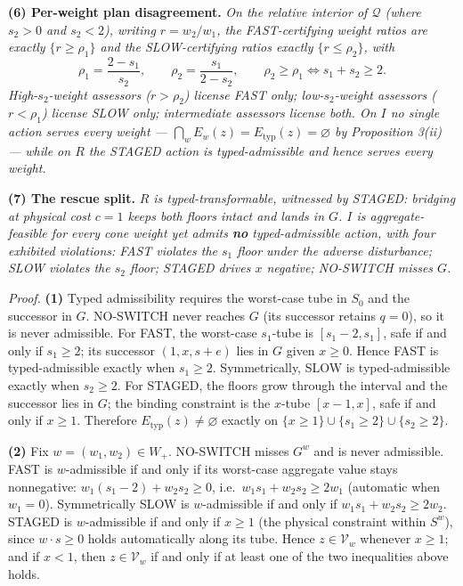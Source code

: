 \documentclass[11pt]{article}
\begin{document}
\textbf{(6) Per-weight plan disagreement.} \emph{On the relative
interior of \(\mathcal{Q}\) (where \(s_2 > 0\) and \(s_2 < 2\)), writing
\(r = w_2 / w_1\), the FAST-certifying weight ratios are exactly
\(\{ r \ge \rho_1 \}\) and the SLOW-certifying ratios exactly
\(\{ r \le \rho_2 \}\), with}
\[\rho_1 = \frac{2 - s_1}{s_2}, \qquad \rho_2 = \frac{s_1}{2 - s_2}, \qquad \rho_2 \ge \rho_1 \iff s_1 + s_2 \ge 2.\]
\emph{High-\(s_2\)-weight assessors (\(r > \rho_2\)) license FAST only;
low-\(s_2\)-weight assessors (\(r < \rho_1\)) license SLOW only;
intermediate assessors license both. On \(I\) no single action serves
every weight ---
\(\bigcap_w E_w(z) = E_{\mathrm{typ}}(z) = \varnothing\) by Proposition
3(ii) --- while on \(R\) the STAGED action is typed-admissible and hence
serves every weight.}

\textbf{(7) The rescue split.} \emph{\(R\) is typed-transformable,
witnessed by STAGED: bridging at physical cost \(c = 1\) keeps both
floors intact and lands in \(G\). \(I\) is aggregate-feasible for every
cone weight yet admits \textbf{no} typed-admissible action, with four
exhibited violations: FAST violates the \(s_1\) floor under the adverse
disturbance; SLOW violates the \(s_2\) floor; STAGED drives \(x\)
negative; NO-SWITCH misses \(G\).}

\emph{Proof.} \textbf{(1)} Typed admissibility requires the worst-case
tube in \(S_0\) and the successor in \(G\). NO-SWITCH never reaches
\(G\) (its successor retains \(q = 0\)), so it is never admissible. For
FAST, the worst-case \(s_1\)-tube is \([s_1 - 2, s_1]\), safe if and
only if \(s_1 \ge 2\); its successor \((1, x, s + e)\) lies in \(G\)
given \(x \ge 0\). Hence FAST is typed-admissible exactly when
\(s_1 \ge 2\). Symmetrically, SLOW is typed-admissible exactly when
\(s_2 \ge 2\). For STAGED, the floors grow through the interval and the
successor lies in \(G\); the binding constraint is the \(x\)-tube
\([x - 1, x]\), safe if and only if \(x \ge 1\). Therefore
\(E_{\mathrm{typ}}(z) \neq \varnothing\) exactly on
\(\{x \ge 1\} \cup \{s_1 \ge 2\} \cup \{s_2 \ge 2\}\).

\textbf{(2)} Fix \(w = (w_1, w_2) \in W_+\). NO-SWITCH misses \(G^w\)
and is never admissible. FAST is \(w\)-admissible if and only if its
worst-case aggregate value stays nonnegative:
\(w_1(s_1 - 2) + w_2 s_2 \ge 0\), i.e.~\(w_1 s_1 + w_2 s_2 \ge 2 w_1\)
(automatic when \(w_1 = 0\)). Symmetrically SLOW is \(w\)-admissible if
and only if \(w_1 s_1 + w_2 s_2 \ge 2 w_2\). STAGED is \(w\)-admissible
if and only if \(x \ge 1\) (the physical constraint within \(S^w\)),
since \(w \cdot s \ge 0\) holds automatically along its tube. Hence
\(z \in \mathcal{V}_w\) whenever \(x \ge 1\); and if \(x < 1\), then
\(z \in \mathcal{V}_w\) if and only if at least one of the two
inequalities above holds.
\end{document}
